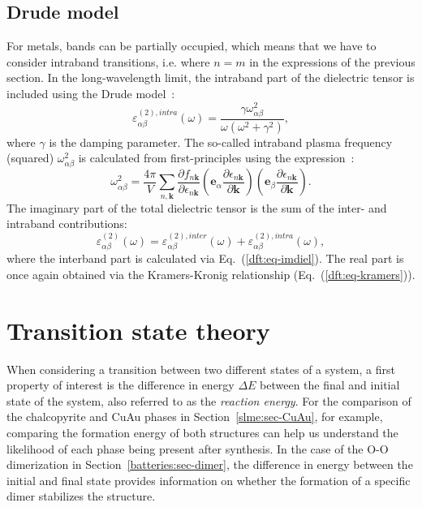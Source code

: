 \begin{refsection}
\subsection{Drude model} \label{dft:sec-drude}

For metals, bands can be partially occupied, which means that we have to consider 
intraband transitions, i.e. where $n=m$ in the expressions of the previous section. 
In the long-wavelength limit, the intraband part of the dielectric tensor is 
included using the Drude model~\cite{Harl2008}:
\begin{equation}
\varepsilon_{\alpha\beta}^{(2), intra} (\omega) = \frac{\gamma\omega^2_{\alpha\beta}}{\omega
(\omega^2 + \gamma^2)},
\end{equation}
where $\gamma$ is the damping parameter. The so-called intraband plasma frequency 
(squared) $\omega^2_{\alpha\beta}$ is calculated from first-principles using the 
expression~\cite{Harl2008}:
\begin{equation}
\omega^2_{\alpha\beta} = \frac{4 \pi}{V} \sum_{n, \mathbf{k}} \frac{\partial 
f_{n\mathbf{k}}}{\partial \epsilon_{n\mathbf{k}}} \left(\mathbf{e}_\alpha \frac{\partial 
\epsilon_{n\mathbf{k}}}{\partial \mathbf{k}}\right) \left(\mathbf{e}_\beta \frac{\partial 
\epsilon_{n\mathbf{k}}}{\partial \mathbf{k}}\right).
\end{equation}
The imaginary part of the total dielectric tensor is the sum of the inter- and 
intraband contributions:
\begin{equation}
\varepsilon_{\alpha\beta}^{(2)} (\omega)  = \varepsilon_{\alpha\beta}^{(2), inter} 
(\omega) + \varepsilon_{\alpha\beta}^{(2), intra} (\omega),
\end{equation}
where the interband part is calculated via Eq.~(\ref{dft:eq-imdiel}). The real part 
is once again obtained via the Kramers-Kronig relationship (Eq.~(\ref{dft:eq-kramers})).

\section{Transition state theory}\label{dft:sec-transition} 

When considering a transition between two different states of a system, a 
first property of interest is the difference in energy $\Delta E$ between the 
final and initial state of the system, also referred to as the \textit{reaction energy}. For the comparison of the chalcopyrite 
and CuAu phases in Section~\ref{slme:sec-CuAu}, for example, comparing the formation energy 
of both structures can help us understand the likelihood of each phase being 
present after synthesis. In the case of the O-O dimerization in 
Section~\ref{batteries:sec-dimer}, the difference in energy between the 
initial and final state provides information on whether the formation 
of a specific dimer stabilizes the structure. 
 

\end{refsection}

